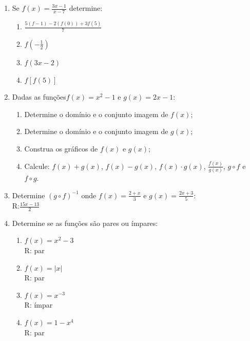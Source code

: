 \documentclass[oneside,a4paper,12pt]{article}
\begin{document}
\begin{enumerate}
	\item Se $f(x) = \frac{3x-1}{x-7}$ determine:
	\begin{multicols}{2}
	\begin{enumerate}
		\item $\frac{5(f-1)-2(f(0))+3f(5)}{7}$
		\item $f(-\frac{1}{2})$
		\item $f(3x-2)$
		\item $f[f(5)]$
	\end{enumerate}
	\end{multicols}

	\item Dadas as funções$f(x) = x^2 -1$ e $g(x) = 2x -1$:
	\begin{multicols}{2}
	\begin{enumerate}
		\item Determine o domínio e o conjunto imagem de $f(x)$;
		\item Determine o domínio e o conjunto imagem de $g(x)$;
		\item Construa os gráficos de $f(x)$ e $g(x)$;
		\item Calcule: $f(x) + g(x)$, $f(x) - g(x)$, $f(x) \cdot g(x)$, $\frac{f(x)}{g(x)}$, $g \circ f$ e $f \circ g$.
	\end{enumerate}
	\end{multicols}

	\item Determine $(g \circ f)^{-1}$ onde $f(x) = \frac{2+x}{3}$ e $g(x) = \frac{2x+3}{5}$: \\ R:$\frac{15x-13}{2}$

	
	\item Determine se as funções são pares ou ímpares:
	\begin{multicols}{2}
	\begin{enumerate}
		\item $ f(x) = x^2 - 3$ \\ R: par
		\item $f(x) = |x|$ \\ R: par
		\item $f(x) = x^{-3}$ \\ R: ímpar
		\item $f(x) = 1 - x^{4}$ \\ R: par
	\end{enumerate}
	\end{multicols}


\end{enumerate}
\end{document}
